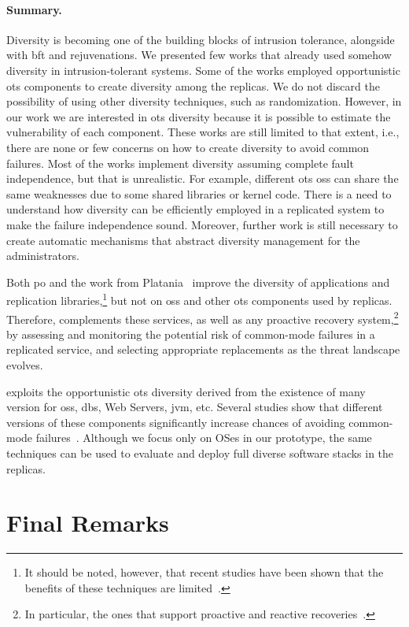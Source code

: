 \paragraph{Summary.} 
Diversity is becoming one of the building blocks of intrusion tolerance, alongside with \gls{bft} and rejuvenations. 
We presented few works that already used somehow diversity in intrusion-tolerant systems. Some of the works employed opportunistic \gls{ots} components to create diversity among the replicas. 
We do not discard the possibility of using other diversity techniques, such as randomization. 
However, in our work we are interested in \gls{ots} diversity because it is possible to estimate the vulnerability of each component. 
These works are still limited to that extent, i.e., there are none or few concerns on how to create diversity to avoid common failures. 
Most of the works implement diversity assuming complete fault independence, but that is unrealistic. 
For example, different \gls{ots} \glspl{os} can share the same weaknesses due to some shared libraries or kernel code. 
There is a need to understand how diversity can be efficiently employed in a replicated system to make the failure independence sound. 
Moreover, further work is still necessary to create automatic mechanisms that abstract diversity management for the administrators.

Both \gls{po} and the work from Platania~\etal{} improve the diversity of applications and replication libraries,\footnote{It should be noted, however, that recent studies have been shown that the benefits of these techniques are limited~\cite{Snow:2013,Bittau:2014}.} but not on \glspl{os} and other \gls{ots} components used by replicas.
Therefore, \system complements these services, as well as any proactive recovery system,\footnote{In particular, the ones that support proactive and reactive recoveries~\cite{Sousa:2010}.} by assessing and monitoring the potential risk of common-mode failures in a replicated service, and selecting appropriate replacements as the threat landscape evolves.

\system exploits the opportunistic \gls{ots} diversity derived from the existence of many version for \glspl{os}, \glspl{db}, Web Servers, \gls{jvm}, etc.
Several studies show that different versions of these components significantly increase chances of avoiding common-mode failures~\cite{Gashi:2007,Garcia:2014,Gorbenko:2011}.
Although we focus only on OSes in our \system prototype, the same techniques can be used to evaluate and deploy full diverse software stacks in the replicas.


\section{Final Remarks}






